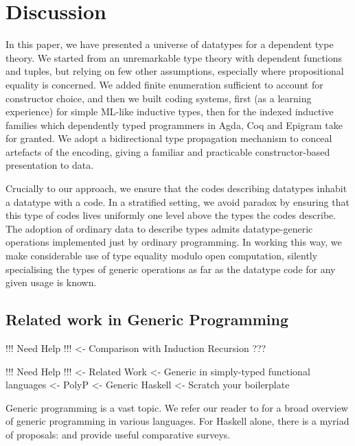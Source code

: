 \section{Discussion}


In this paper, we have presented a universe of datatypes for a
dependent type theory. We started from an unremarkable type theory
with dependent functions and tuples, but relying on few other
assumptions, especially where propositional equality is concerned.  We
added finite enumeration sufficient to account for constructor choice,
and then we built coding systems, first (as a learning experience) for
simple ML-like inductive types, then for the indexed inductive
families which dependently typed programmers in Agda, Coq and Epigram
take for granted. We adopt a bidirectional type propagation mechanism
to conceal artefacts of the encoding, giving a familiar and practicable
constructor-based presentation to data.

Crucially to our approach, we ensure that the codes describing
datatypes inhabit a datatype with a code. In a stratified setting, we
avoid paradox by ensuring that this type of codes lives uniformly one
level above the types the codes describe. The adoption of ordinary
data to describe types admits datatype-generic operations implemented
just by ordinary programming. In working this way, we make
considerable use of type equality modulo open computation, silently
specialising the types of generic operations as far as the datatype
code for any given usage is known.

\subsection{Related work in Generic Programming}

\begin{wstructure}
!!! Need Help !!!
<- Comparison with Induction Recursion
    ???
\end{wstructure}


\begin{wstructure}
!!! Need Help !!!
<- Related Work
    <- Generic in simply-typed functional languages
        <- PolyP \cite{jansson:polyp}
        <- Generic Haskell \cite{hinze:generic-haskell}
        <- Scratch your boilerplate \cite{spj:syb}
\end{wstructure}

Generic programming is a vast topic. We refer our reader to
\citet{garcia:generic-comparative-study} for a broad overview of
generic programming in various languages. For Haskell alone, there is
a myriad of proposals: 
\citet{hinze:generic-approach-comparative} and
\citet{rodriguez:generic-libs-comparative} provide useful comparative
surveys.

